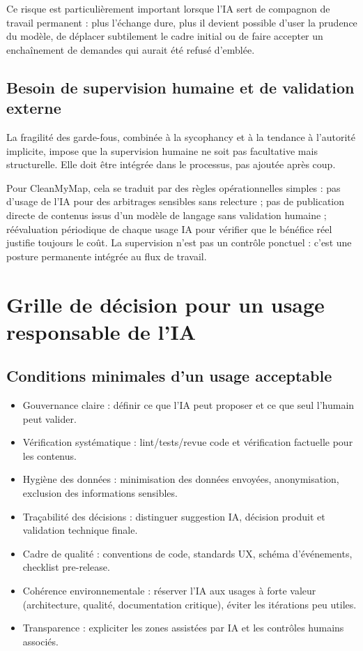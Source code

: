 \documentclass[
  10pt,
  a4paper,
  DIV=11,
  numbers=noendperiod,
  oneside]{scrreprt}
\begin{document}
Ce risque est particulièrement important lorsque l'IA sert de compagnon
de travail permanent : plus l'échange dure, plus il devient possible
d'user la prudence du modèle, de déplacer subtilement le cadre initial
ou de faire accepter un enchaînement de demandes qui aurait été refusé
d'emblée.

\subsection{Besoin de supervision humaine et de validation
externe}\label{besoin-de-supervision-humaine-et-de-validation-externe}

La fragilité des garde-fous, combinée à la sycophancy et à la tendance à
l'autorité implicite, impose que la supervision humaine ne soit pas
facultative mais structurelle. Elle doit être intégrée dans le
processus, pas ajoutée après coup.

Pour CleanMyMap, cela se traduit par des règles opérationnelles simples
: pas d'usage de l'IA pour des arbitrages sensibles sans relecture ; pas
de publication directe de contenus issus d'un modèle de langage sans
validation humaine ; réévaluation périodique de chaque usage IA pour
vérifier que le bénéfice réel justifie toujours le coût. La supervision
n'est pas un contrôle ponctuel : c'est une posture permanente intégrée
au flux de travail.

\section{Grille de décision pour un usage responsable de
l'IA}\label{grille-de-duxe9cision-pour-un-usage-responsable-de-lia}

\subsection{Conditions minimales d'un usage
acceptable}\label{conditions-minimales-dun-usage-acceptable}

\begin{itemize}
\item
  Gouvernance claire : définir ce que l'IA peut proposer et ce que seul
  l'humain peut valider.
\item
  Vérification systématique : lint/tests/revue code et vérification
  factuelle pour les contenus.
\item
  Hygiène des données : minimisation des données envoyées,
  anonymisation, exclusion des informations sensibles.
\item
  Traçabilité des décisions : distinguer suggestion IA, décision produit
  et validation technique finale.
\item
  Cadre de qualité : conventions de code, standards UX, schéma
  d'événements, checklist pre-release.
\item
  Cohérence environnementale : réserver l'IA aux usages à forte valeur
  (architecture, qualité, documentation critique), éviter les itérations
  peu utiles.
\item
  Transparence : expliciter les zones assistées par IA et les contrôles
  humains associés.
\end{itemize}
\end{document}
